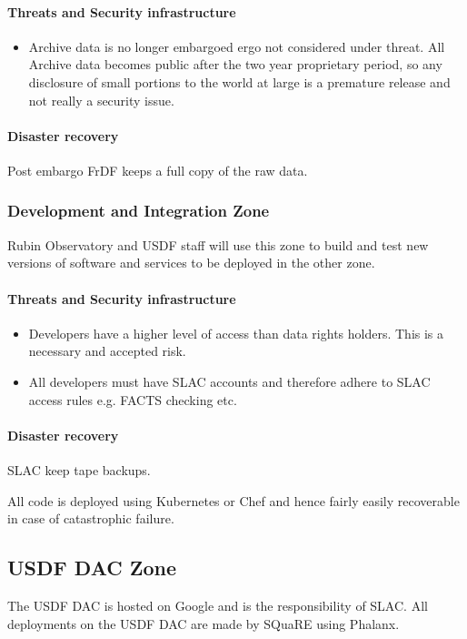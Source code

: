 \paragraph{ Threats and Security infrastructure}

\begin{itemize}
\item \gls{Archive} data is no longer embargoed ergo not considered under threat.  All Archive data becomes public after the two year proprietary period, so any disclosure of small portions to the world at large is a premature release and not really a security issue.
\end{itemize}
\paragraph{Disaster recovery}
Post embargo \gls{FrDF} keeps a full copy of the raw data.

\subsubsection{Development and Integration Zone}
Rubin Observatory and \gls{USDF} staff will use this zone to build and test new versions of \gls{software} and services to be deployed in the other zone.

\paragraph{Threats and Security infrastructure}

\begin{itemize}
\item Developers have a higher level of access than data rights holders.
This is a necessary and accepted risk.
\item All developers must have SLAC accounts and therefore adhere to SLAC access rules e.g. \gls{FACTS} checking etc.
\end{itemize}

\paragraph{Disaster recovery}
SLAC keep tape backups.

All code is deployed using \gls{Kubernetes} or Chef and hence fairly easily recoverable in case of catastrophic failure.


\subsection{ \gls{USDF} \gls{DAC} Zone}
The USDF \gls{DAC} is hosted on Google and  is the responsibility of SLAC.
All deployments on the USDF DAC are made by \gls{SQuaRE} using Phalanx.


